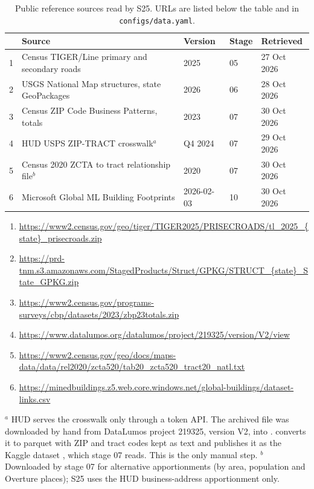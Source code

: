 \documentclass[11pt]{article}
\begin{document}
\begin{table}[htbp]
\centering
\small
\caption{Public reference sources read by S25. URLs are listed below the
table and in \texttt{configs/data.yaml}.}
\label{tab:sources}
\begin{tabular}{lllll}
\toprule
& Source & Version & Stage & Retrieved \\
\midrule
1 & Census TIGER/Line primary and secondary roads & 2025 & 05 & 27 Oct 2026 \\
2 & USGS National Map structures, state GeoPackages & 2026 & 06 & 28 Oct 2026 \\
3 & Census ZIP Code Business Patterns, totals & 2023 & 07 & 30 Oct 2026 \\
4 & HUD USPS ZIP-TRACT crosswalk$^{a}$ & Q4 2024 & 07 & 29 Oct 2026 \\
5 & Census 2020 ZCTA to tract relationship file$^{b}$ & 2020 & 07 & 30 Oct 2026 \\
6 & Microsoft Global ML Building Footprints & 2026-02-03 & 10 & 30 Oct 2026 \\
\bottomrule
\end{tabular}

\vspace{6pt}
\begin{minipage}{0.95\textwidth}\footnotesize
\begin{enumerate}[leftmargin=1.5em, itemsep=0pt]
\item \url{https://www2.census.gov/geo/tiger/TIGER2025/PRISECROADS/tl_2025_{state}_prisecroads.zip}
\item \url{https://prd-tnm.s3.amazonaws.com/StagedProducts/Struct/GPKG/STRUCT_{state}_State_GPKG.zip}
\item \url{https://www2.census.gov/programs-surveys/cbp/datasets/2023/zbp23totals.zip}
\item \url{https://www.datalumos.org/datalumos/project/219325/version/V2/view}
\item \url{https://www2.census.gov/geo/docs/maps-data/data/rel2020/zcta520/tab20_zcta520_tract20_natl.txt}
\item \url{https://minedbuildings.z5.web.core.windows.net/global-buildings/dataset-links.csv}
\end{enumerate}
\vspace{4pt}
$^{a}$ HUD serves the crosswalk only through a token API. The archived file
 was downloaded by hand from DataLumos
project 219325, version V2, into .
 converts it to parquet with ZIP and tract codes
kept as text and publishes it as the Kaggle dataset
, which stage 07 reads. This is the only
manual step. $^{b}$ Downloaded by stage 07 for alternative apportionments (by
area, population and Overture places); S25 uses the HUD business-address
apportionment only.
\end{minipage}
\end{table}
\end{document}
